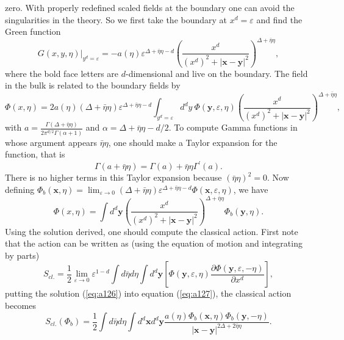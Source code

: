 \documentclass[a4paper,11pt]{article}
\begin{document}
zero. With properly redefined scaled fields at the boundary one
can avoid the singularities in the theory. So we first take the
boundary at $ x^d=\varepsilon$ and find the Green function
\cite{muck}
\begin{equation}\label{eq:a123}
G(x,y,\eta)|_{y^d=\varepsilon}=-a(\eta)\varepsilon^
{\Delta+\bar{\eta}\eta-d}
\left(\frac{x^d}{(x^d)^2+|\mathbf{x-y}|^2}\right)^
{\Delta+\bar{\eta}\eta},
\end{equation}
where the bold face letters are $d$-dimensional and live on the
boundary. The field in the bulk is related to the boundary fields
by
\begin{equation}  \label{eq:a124}
\Phi(x,\eta)=2a(\eta)(\Delta+\bar{\eta}\eta)\varepsilon^{\Delta+\bar{\eta}
\eta-d} \int_{y^d=\varepsilon} d^d y\:
\Phi(\mathbf{y},\varepsilon,\eta)
\left(\frac{x^d}{(x^d)^2+|\mathbf{x-y}|^2}\right)^
{\Delta+\bar{\eta}\eta},
\end{equation}
with $a=\frac{\Gamma(\Delta+\bar{\eta}\eta)}{2\pi^{d/2}
\Gamma(\alpha+1)}$ and $\alpha=\Delta+\bar{\eta}\eta-d/2$. To
compute Gamma functions in whose argument appears
$\bar{\eta}\eta$, one should make a Taylor expansion for the
function, that is
\begin{equation}\label{eq:a125}
\Gamma(a+\bar{\eta}\eta)=\Gamma(a)+\bar{\eta}\eta\Gamma^{\prime}(a).
\end{equation} There is no higher terms in this Taylor expansion
because $(\bar{\eta} \eta)^2=0$. Now defining
$\Phi_b(\mathbf{x},\eta)=\lim_{\varepsilon\rightarrow0} (\Delta+
\bar{\eta}\eta)\varepsilon^{\Delta+\bar{\eta}\eta-d}\Phi(\mathbf{x}
,\varepsilon,\eta)$, we have
\begin{equation}\label{eq:a126}
\Phi(x,\eta)=\int d^d \mathbf{y}
\left(\frac{x^d}{(x^d)^2+|\mathbf{x-y}|^2} \right)^
{\Delta+\bar{\eta}\eta} \Phi_b(\mathbf{y},\eta).
\end{equation}
Using the solution derived, one should compute the classical
action. First note that the action can be written as (using the
equation of motion and integrating by parts)
\begin{equation}  \label{eq:a127}
S_{cl.}=\frac{1}{2} \lim_{\varepsilon\rightarrow 0}
\varepsilon^{1-d} \int d \bar{\eta}d \eta \int d^d \mathbf{y}
\left[\Phi(\mathbf{y},\varepsilon,\eta) \frac{\partial
\Phi(\mathbf{y},\varepsilon,-\eta)}{\partial x^d}\right],
\end{equation}
putting the solution (\ref{eq:a126}) into equation
(\ref{eq:a127}), the classical action becomes
\begin{equation}  \label{eq:a128}
S_{cl.}(\Phi_b)=\frac{1}{2}\int d \bar{\eta}d \eta \int d^d
\mathbf{x} d^d \mathbf{y} \frac{a(\eta)
\Phi_b(\mathbf{x},\eta)\Phi_b(\mathbf{y},-\eta)}{|
\mathbf{x-y}|^{2\Delta+2\bar{\eta}\eta}}.
\end{equation}
\end{document}

